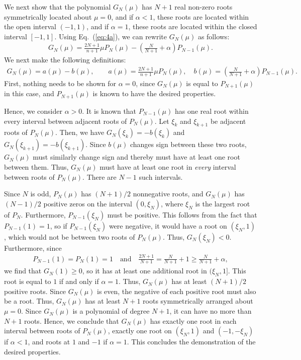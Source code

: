 \documentclass[12pt]{article}
\newcommand{\EQ}[1]{Eq.~(\ref{eq:#1})}
\begin{document}
We next show that the polynomial $G_N(\mu)$ has $N+1$ real non-zero roots symmetrically 
located about $\mu=0$, and if $\alpha < 1$, these roots are located within the open interval $(-1,1)$, and if $\alpha=1$, 
these roots are located within the closed interval $[-1,1]$.
Using \EQ{4a}, we can rewrite $G_N(\mu)$ as follows:
\begin{gather}
  \label{eq:polynomials:2}
  G_N(\mu) = \frac{2N+1}{n+1} \mu P_N(\mu)
  - \left(\frac{N}{N+1}+\alpha\right) P_{N-1}(\mu).
\end{gather}
We next make the following definitions:
  \begin{gather}
    \label{eq:polynomials:3}
    G_N(\mu) = a(\mu) - b(\mu),
    \qquad a(\mu) = \frac{2N+1}{n+1} \mu P_N(\mu),
    \quad b(\mu) = \left(\frac{N}{N+1}+\alpha\right) P_{N-1}(\mu).
  \end{gather}
  First, nothing needs to be shown for $\alpha = 0$, since $G_N(\mu)$ is equal to 
  $P_{N+1}(\mu)$ in this case, and $P_{N+1}(\mu)$ is known to have the desired properties.
  
  Hence, we consider $\alpha > 0$.  It is known that $P_{N-1}(\mu)$ has one real root 
  within every interval between adjacent roots of $P_N(\mu)$. Let $\xi_k$ and $\xi_{k+1}$ be 
  adjacent roots of $P_{N}(\mu)$.  Then, we have $G_N(\xi_k) = -b(\xi_k)$ 
  and $G_N(\xi_{k+1}) = -b(\xi_{k+1})$. Since $b(\mu)$ changes sign between 
  these two roots, $G_N(\mu)$ must similarly change sign and thereby must 
  have at least one root between them. Thus, $G_N(\mu)$ must have at least one root in {\it every} 
  interval between roots of $P_N(\mu)$. There are $N-1$ such intervals.
  
  Since $N$ is odd, $P_N(\mu)$ has $(N+1)/2$ nonnegative roots,
  and $G_N(\mu)$ has $(N-1)/2$ positive zeros on the
  interval $(0,\xi_N)$, where $\xi_N$ is the largest root of
  $P_N$. Furthermore, $P_{N-1}(\xi_N)$ must be positive.  This follows from 
  the fact that $P_{N-1}(1)=1$, so if $P_{N-1}(\xi_N)$ were negative, it would have a root 
  on $(\xi_N,1)$, which would not be between two roots of $P_{N}(\mu)$. Thus,
  $G_N(\xi_N)< 0$. Furthermore, since
  \begin{gather}
    \label{eq:polynomials:4}
    P_{N-1}(1) = P_{N}(1) = 1 \quad\text{and}\quad
    \frac{2N+1}{N+1} = \frac{N}{N+1} + 1 \ge \frac{N}{N+1}+\alpha,
  \end{gather}
  we find that $G_N(1) \ge 0$, so it has at least one additional root in
  $(\xi_N,1]$.  This root is equal to $1$ if and only if $\alpha = 1$.  Thus, $G_N(\mu)$ has at least
  $(N+1)/2$ positive roots. Since $G_N(\mu)$ is even, the negative of each positive root must also be a root. 
  Thus, $G_N(\mu)$ has at least $N+1$ roots symmetrically arranged about $\mu=0$.  
  Since $G_N(\mu)$ is a polynomial of degree $N+1$, it can have no more than $N+1$ roots.  Hence, we conclude 
  that $G_N(\mu)$ has exactly one root in each interval between roots of $P_N(\mu)$, exactly one root on 
  $(\xi_N,1)$ and $(-1,-\xi_N)$ if $\alpha < 1$, and roots at $1$ and $-1$ if $\alpha=1$.  This concludes the 
  demonstration of the desired properties. 
  
\end{document}
